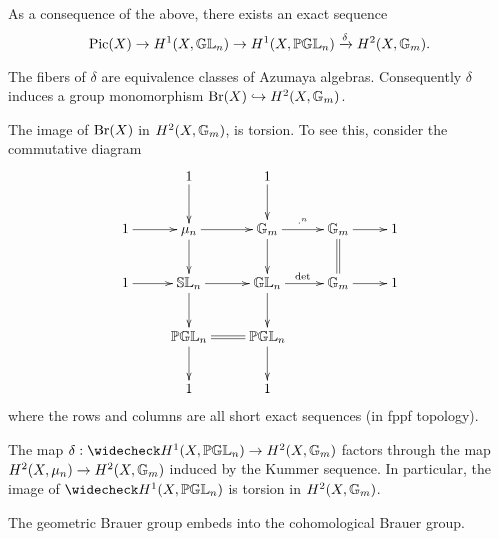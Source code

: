As a consequence of the above, there exists an exact sequence
$$\textnormal{Pic}(X)\rightarrow H^1(X,\mathbb{GL}_n)\rightarrow H^1(X,\mathbb{PGL}_n)\xrightarrow{\delta} H^2(X,\mathbb{G}_m).$$

\begin{prop}
The fibers of $\delta$ are equivalence classes of Azumaya algebras.  Consequently $\delta$ induces a group monomorphism $\textnormal{Br}(X)\hookrightarrow  H^2(X,\mathbb{G}_m)$.
\end{prop}

The image of $\textnormal{Br}(X)$ in $H^2(X,\mathbb{G}_m)$, is torsion.  To see this, consider the commutative diagram
$$\xymatrix{
& 1\ar[d] & 1\ar[d]\\
1\ar[r] & \mu_n\ar[d]\ar[r] & \bbg_m\ar[d]\ar[r]^{\cdot^n} & \bbg_m\ar@{=}[d]\ar[r] & 1\\
1\ar[r] & \bbsl_n\ar[d]\ar[r] & \bbgl_n\ar[d]\ar[r]^{\det} & \bbg_m\ar[r] & 1\\
& \bbpgl_n\ar[d] \ar@{=}[r]& \bbpgl_n\ar[d]\\
& 1 & 1
}$$
where the rows and columns are all short exact sequences (in fppf topology).
\begin{prop}
The map $\delta: \wc H^1(X,\bbpgl_n)\rightarrow H^2(X,\bbg_m)$ factors through the map $H^2(X,\mu_n)\rightarrow H^2(X,\mathbb{G}_m)$ induced by the Kummer sequence.  In particular, the image of $\wc H^1(X,\bbpgl_n)$ is torsion in $H^2(X,\mathbb{G}_m)$.
\end{prop}
\begin{cor}
The geometric Brauer group embeds into the cohomological Brauer group.
\end{cor}

